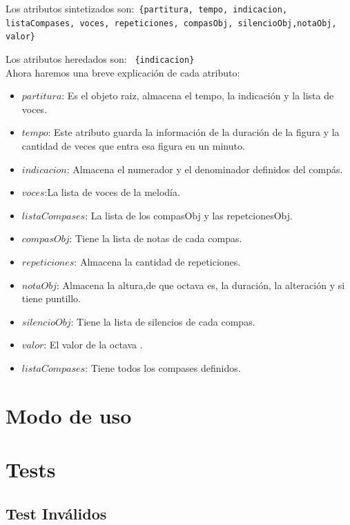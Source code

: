 \documentclass[a4paper]{article}
\begin{document}
Los atributos sintetizados son:\texttt{
\{partitura, tempo, indicacion, listaCompases, voces, repeticiones, compasObj, silencioObj,notaObj, valor\}
}\linebreak


Los atributos heredados son: 
\texttt{
\{indicacion\}
}\\  

Ahora haremos una breve explicación de cada atributo:

\begin{itemize}
\item $partitura$: Es el objeto raiz, almacena el tempo, la indicación y la lista de voces. 
\item $tempo$: Este atributo guarda la información de la duración de la figura y la cantidad de veces que entra esa figura en un minuto.
\item $indicacion$: Almacena el numerador y el denominador definidos del compás.
\item $voces$:La lista de voces de la melodía.
\item $listaCompases$: La lista de los compasObj y las repetcionesObj.
\item $compasObj$: Tiene la lista de notas  de cada compas.
\item $repeticiones$: Almacena la cantidad de repeticiones.
\item $notaObj$: Almacena la altura,de que octava es, la duración, la alteración y si tiene puntillo.
\item $silencioObj$: Tiene la lista de silencios de cada compas.
\item $valor$: El valor de la octava .
\item $listaCompases$: Tiene todos los compases definidos.

\end{itemize}

\newpage

\section{Modo de uso}

\section{Tests}
\subsection{Test Inválidos}
\end{document}
